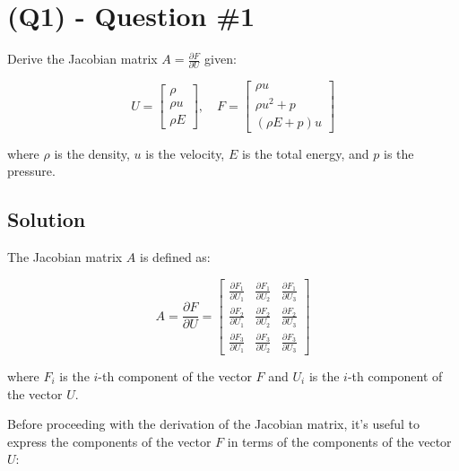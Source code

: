 \section{(Q1) - Question \#1}
\label{sec:Q1}

Derive the Jacobian matrix $A = \frac{\partial F}{\partial U}$ given:

\begin{equation}
    U = \begin{bmatrix}
        \rho   \\
        \rho u \\
        \rho E
    \end{bmatrix}, \quad
    F = \begin{bmatrix}
        \rho u       \\
        \rho u^2 + p \\
        (\rho E + p) u
    \end{bmatrix}
\end{equation}

where $\rho$ is the density, $u$ is the velocity, $E$ is the total energy, and $p$ is the pressure.

\subsection{Solution}

The Jacobian matrix $A$ is defined as:

\begin{equation}
    A = \frac{\partial F}{\partial U} = \begin{bmatrix}
        \frac{\partial F_1}{\partial U_1} & \frac{\partial F_1}{\partial U_2} & \frac{\partial F_1}{\partial U_3} \\
        \frac{\partial F_2}{\partial U_1} & \frac{\partial F_2}{\partial U_2} & \frac{\partial F_2}{\partial U_3} \\
        \frac{\partial F_3}{\partial U_1} & \frac{\partial F_3}{\partial U_2} & \frac{\partial F_3}{\partial U_3}
    \end{bmatrix}
    \label{eq:jacobian_matrix}
\end{equation}

where $F_i$ is the $i$-th component of the vector $F$ and $U_i$ is the $i$-th component of the vector $U$.

Before proceeding with the derivation of the Jacobian matrix, it's useful to express the components of the vector $F$ in terms of the components of the vector $U$:


